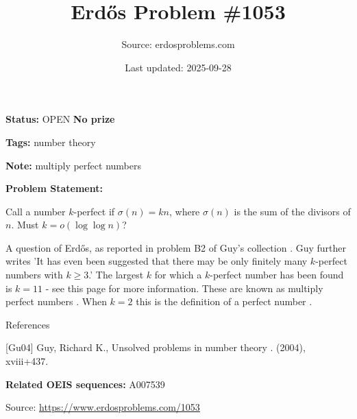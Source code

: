 \documentclass{article}
\title{Erd\H{o}s Problem \#1053}
\date{Last updated: 2025-09-28}
\author{Source: erdosproblems.com}
\begin{document}
\maketitle

\noindent\textbf{Status:} OPEN \quad \textbf{No prize}

\noindent\textbf{Tags:} number theory

\medskip
\noindent\textbf{Note:} multiply perfect numbers

\medskip

\noindent\textbf{Problem Statement:}

Call a number $k$-perfect if $\sigma(n)=kn$, where $\sigma(n)$ is the sum of the divisors of $n$. Must $k=o(\log\log n)$?




A question of Erd\H{o}s, as reported in problem B2 of Guy's collection \cite{Gu04}. Guy further writes 'It has even been suggested that there may be only finitely many $k$-perfect numbers with $k\geq 3$.' The largest $k$ for which a $k$-perfect number has been found is $k=11$ - see this page for more information. These are known as multiply perfect numbers . When $k=2$ this is the definition of a perfect number .




References

[Gu04] Guy, Richard K., Unsolved problems in number theory . (2004), xviii+437.

\noindent\textbf{Related OEIS sequences:} A007539


\bigskip
\noindent\small{Source: \url{https://www.erdosproblems.com/1053}}
\end{document}
